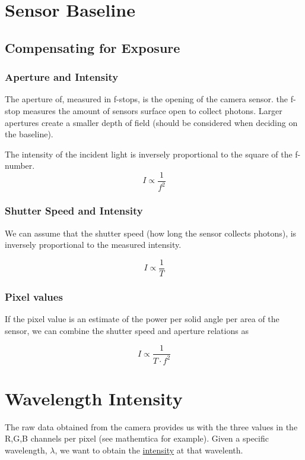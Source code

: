 \documentclass{article}
\begin{document}
\section{Sensor Baseline}

\subsection{Compensating for Exposure}

\subsubsection{Aperture and Intensity}

The aperture of, measured in f-stops, is the opening of the camera sensor. the
f-stop measures the amount of sensors surface open to collect photons. Larger
apertures create a smaller depth of field (should be considered when deciding on the baseline).

The intensity of the incident light is inversely proportional to the square of the
f-number.
$$ I \propto \frac{1}{f^2} $$

\subsubsection{Shutter Speed and Intensity}
We can assume that the shutter speed (how long the sensor collects photons), is inversely proportional
to the measured intensity.

$$ I \propto \frac{1}{T}$$

\subsubsection{Pixel values}

If the pixel value is an estimate of the power per solid angle per area of the sensor, we can combine the
shutter speed and aperture relations as

$$ I \propto \frac{1}{T \cdot f^2}$$
\section{Wavelength Intensity}

The raw data obtained from the camera provides us with the three values in the
R,G,B channels per pixel (see mathemtica for example). Given a specific wavelength, $ \lambda$, we want to obtain the
\underline{intensity} at that wavelenth.
\end{document}

